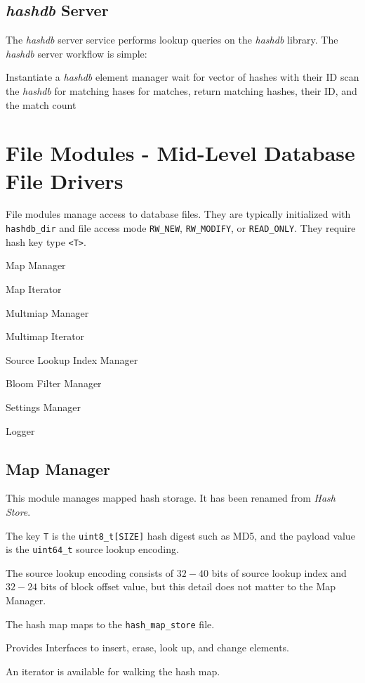 \documentclass[12pt,twoside]{article}
\newcommand{\hdb}{\emph{hashdb}\xspace}
\begin{document}
\subsection{\hdb Server}
The \hdb server service performs lookup queries on the \hdb library.
The \hdb server workflow is simple:

\begin{algorithmic}
\STATE Instantiate a \hdb element manager
  \STATE wait for vector of hashes with their ID
  \STATE scan the \hdb for matching hases
  \STATE for matches, return matching hashes, their ID, and the match count
\ENDWHILE
\end{algorithmic}

\section{File Modules - Mid-Level Database File Drivers}
File modules manage access to database files.
They are typically initialized with \texttt{hashdb\_dir} and file access mode
\texttt{RW\_NEW}, \texttt{RW\_MODIFY}, or \texttt{READ\_ONLY}.
They require hash key type \texttt{<T>}.

\begin{compactitem}
\item Map Manager
\item Map Iterator
\item Multmiap Manager
\item Multimap Iterator
\item Source Lookup Index Manager
\item Bloom Filter Manager
\item Settings Manager
\item Logger
\end{compactitem}

\subsection{Map Manager}
This module manages mapped hash storage.
It has been renamed from \textit{Hash Store}.
\begin{compactitem}
\item The key \texttt{T} is the \texttt{uint8\_t[SIZE]} hash digest such as MD5,
and the payload value is the \texttt{uint64\_t} source lookup encoding.
\item The source lookup encoding consists of $32-40$ bits
of source lookup index and $32-24$ bits of block offset value,
but this detail does not matter to the Map Manager.
\item The hash map maps to the \texttt{hash\_map\_store} file.
\item Provides Interfaces to insert, erase, look up, and change elements.
\item An iterator is available for walking the hash map.
\end{compactitem}
\end{document}
